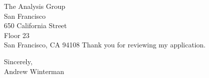 \documentclass[11pt]{letter} %
\begin{document}
\begin{letter}{
The Analysis Group \\
San Francisco \\
650 California Street \\
Floor 23\\
San Francisco, CA  94108}
Thank you for reviewing my application.

Sincerely, \\
Andrew Winterman

\end{letter}
 
\end{document}
